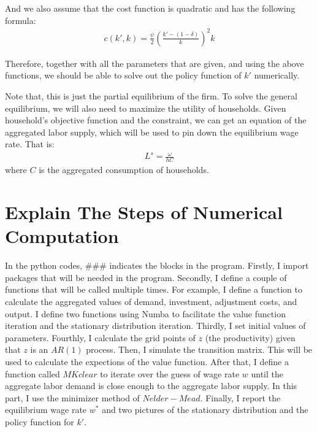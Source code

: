 \documentclass[letterpaper,12pt]{article}
\theoremstyle{definition}
\begin{document}
And we also assume that the cost function is quadratic and has the following formula:
\begin{equation}
\begin{aligned}
c(k',k) = \frac{\psi}{2}(\frac{k' - (1 - \delta)}{k})^{2}k
\end{aligned}
\end{equation}

Therefore, together with all the parameters that are given, and using the above functions, we should be able to solve out the policy function of $ k' $ numerically.

Note that, this is just the partial equilibrium of the firm. To solve the general equilibrium, we will also need to maximize the utility of households. Given household's objective function and the constraint, we can get an equation of the aggregated labor supply, which will be used to pin down the equilibrium wage rate. That is:
\begin{equation}
\begin{aligned}
L^{s} = \frac{\omega}{h C}
\end{aligned}
\end{equation}
where $C$ is the aggregated consumption of households.


\section{Explain The Steps of Numerical Computation}

In the python codes, \#\#\# indicates the blocks in the program. Firstly, I import packages that will be needed in the program. Secondly, I define a couple of functions that will be called multiple times. For example, I define a function to calculate the aggregated values of demand, investment, adjustment costs, and output. I define two functions using Numba to facilitate the value function iteration and the stationary distribution iteration. Thirdly, I set initial values of parameters. Fourthly, I calculate the grid points of $z$ (the productivity) given that $z$ is an $AR(1)$ process. Then, I simulate the transition matrix. This will be used to calculate the expections of the value function. After that, I define a function called $ MKclear $ to iterate over the guess of wage rate $ w $ until the aggregate labor demand is close enough to the aggregate labor supply. In this part, I use the minimizer method of $ Nelder-Mead $. Finally, I report the equilibrium wage rate $ w^* $ and two pictures of the stationary distribution and the policy function for $ k' $.
\end{document}
